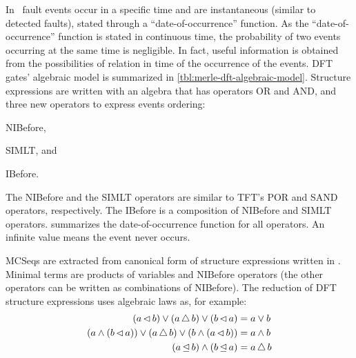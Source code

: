 \documentclass[12pt,openright,twoside,a4paper,oldfontcommands,english,brazil,final]{abntex2}
\theoremstyle{theo}
\newcommand{\parsin}[1]{\ensuremath\left( #1 \right)}
\def\nibefore{\ensuremath\operatorname{\lhd}}
\def\ibefore{\ensuremath\operatorname{\unlhd}}
\def\simultaneous{\ensuremath\operatorname{\bigtriangleup}}
\begin{document}
In~\cite{Merle2010,MRL+2010,MRL2011} fault events occur in a specific time and are instantaneous (similar to detected faults), stated through a ``date-of-occurrence'' function.
As the ``date-of-occurrence'' function is stated in continuous time, the probability of two events occurring at the same time is negligible.
In fact, useful information is obtained from the possibilities of relation in time of the occurrence of the events.
\Ac{DFT} gates' algebraic model is summarized in \cref{tbl:merle-dft-algebraic-model}.
Structure expressions are written with an algebra that has operators \ac{OR} and \ac{AND}, and three new operators to express events ordering:
\begin{alineasinline}
  \item \ac{NIBefore},
  \item \ac{SIMLT}, and
  \item \ac{IBefore}.
\end{alineasinline}
The \ac{NIBefore} and the \ac{SIMLT} operators are similar to \ac{TFT}'s \ac{POR} and \ac{SAND} operators, respectively.
The \ac{IBefore} is a composition of \ac{NIBefore} and \ac{SIMLT} operators.
 summarizes the date-of-occurrence function for all operators.
An infinite value means the event never occurs.

\Acp{MCSeq} are extracted from canonical form of structure expressions written in .
Minimal terms are products of variables and \ac{NIBefore} operators (the other operators can be written as combinations of \ac{NIBefore}).
The reduction of \ac{DFT} structure expressions uses algebraic laws as, for example:
\begin{subequations}
\begin{align}
\parsin{a \nibefore b} \lor
  \parsin{a \simultaneous b} \lor
  \parsin{b \nibefore a} &= a \lor b\\
%
\parsin{a \land \parsin{b \nibefore a}} \lor
  \parsin{a \simultaneous b} \lor
  \parsin{b \land \parsin{a \nibefore b}} &= a \land b\\
%
\parsin{a \ibefore b} \land \parsin{b \ibefore a} &= a \simultaneous b
\end{align}
\end{subequations}
\end{document}
